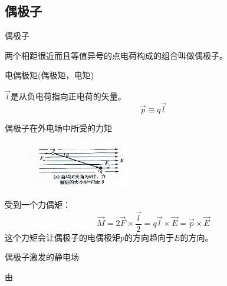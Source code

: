 \documentclass[cn,hazy,blue,14pt,normal]{elegantnote}
\numberwithin{equation}{section}
\begin{document}
\subsection{偶极子}
\begin{definition}
	偶极子
\end{definition}
两个相距很近而且等值异号的点电荷构成的组合叫做偶极子。
\begin{definition}
	电偶极矩(偶极矩，电矩)
\end{definition}
$\vec{l}$是从负电荷指向正电荷的矢量。
$$\vec{p} \equiv q\vec{l}$$
\begin{theorem}
	偶极子在外电场中所受的力矩
\end{theorem}
\begin{figure}
	\includegraphics[width=0.4\textwidth]{image/偶极子.jpg}
\end{figure}
受到一个力偶矩：
$$\vec{M}=2\vec{F}\times\frac{\vec{l}}{2}=q\vec{l}\times\vec{E}=\vec{p}\times\vec{E}$$
这个力矩会让偶极子的电偶极矩$p$的方向趋向于$E$的方向。
\begin{theorem}
	偶极子激发的静电场
\end{theorem}

由
\end{document}
